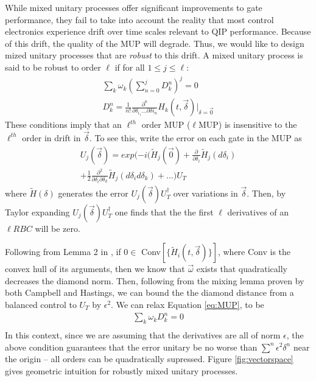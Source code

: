 \documentclass[aps,nofootinbib,pra,notitlepage,twocolumn]{revtex4-1}
\begin{document}
While mixed unitary processes offer significant improvements to gate performance, they fail to take into account the reality that most control electronics experience drift over time scales relevant to QIP performance. Because of this drift, the quality of the MUP will degrade. Thus, we would like to design mized unitary processes that are \textit{robust} to this drift. A mixed unitary process is said to be robust to order $\ell$ if for all $1 \leq j \leq \ell$:
\begin{equation}\label{eq:MUP}
\begin{gathered}
\sum_k\omega_k(\sum_{n=0}^j D^n_k)^j = 0\\
D^n_k = \frac{1}{n!}\frac{\partial^{n}}{\partial\delta_{i_1}...\partial\delta{i_n}}H_k(t,\vec{\delta})|_{\delta=\vec{0}}
\end{gathered}
\end{equation}
These conditions imply that an $\ell^{th}$ order MUP ($\ell$MUP) is insensitive to the $\ell^{th}$ order in drift in $\vec{\delta}$. To see this, write the error on each gate in the MUP as 
\begin{equation}\label{eq:taylor}
\begin{gathered}
U_j(\vec{\delta}) = exp(-i(\tilde{H}_j(\vec{0}) + \frac{\partial}{\partial\delta_i}\tilde{H}_j(d\delta_i)\\ +  \frac{1}{2}\frac{\partial^2}{\partial\delta_i\partial\delta_k} \tilde{H}_j(d\delta_i d\delta_k) + ...)U_T
\end{gathered}
\end{equation}
where $\tilde{H}(\delta)$ generates the error $U_j(\vec{\delta})U_T^{\dagger}$ over variations in $\vec{\delta}$. Then, by Taylor expanding $U_j(\vec{\delta})U_T^{\dagger}$ one finds that the the first $\ell$ derivatives of an $\ell RBC$ will be zero.

Following from Lemma 2 in \cite{Campbell2017}, if $0\in $ Conv$[\{\tilde{H}_i(t, \vec{\delta})\}]$, where Conv is the convex hull of its arguments, then we know that $\vec{\omega}$ exists that quadratically decreases the diamond norm. Then, following from the mixing lemma proven by both Campbell and Hastings\cite{1612.01011}, we can bound the the diamond distance from a balanced control to $U_T$ by $\epsilon^2$. We can relax Equation \ref{eq:MUP}, to be
\begin{equation}\label{eq:RBC-relaxed}
\begin{gathered}
\sum_k\omega_kD^n_k = 0\\
\end{gathered}
\end{equation}
In this context, since we are assuming that the derivatives are all of norm $\epsilon$, the above condition guarantees that the error unitary be no worse than $\sum^n\epsilon^2\delta^n$ near the origin -- all orders can be quadratically supressed. Figure \ref{fig:vectorspace} gives geometric intuition for robustly mixed unitary processes.
\end{document}
